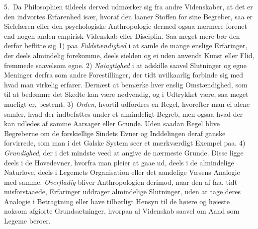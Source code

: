 \documentclass[12pt,a4paper]{article}
\newcommand{\opage}[1]{\marginnote{\footnotesize\textit{[#1]}}}
\begin{document}
5.~Da Philosophien tildeels derved udmærker sig fra andre Videnskaber, at det er
den indvortes Erfarenhed især, hvoraf den laaner Stoffen for sine Begreber, saa er
Sielelæren eller den psychologiske Anthropologie dermed ogsaa nærmere forenet end
nogen anden empirisk Videnskab eller Disciplin. Saa meget mere bør den derfor
beflitte sig 1) paa \emph{Fuldstændighed} i at samle de mange enslige Erfaringer,
der deels almindelig forekomme, deels sielden og ei uden anvendt Kunst eller
Flid, fremmede saavelsom egne. 2) \emph{Nøiagtighed} i at adskille saavel
Slutninger og egne Meninger derfra som andre Forestillinger, der tidt uvilkaarlig
forbinde sig med hvad man virkelig erfarer. Dernæst at bemærke hver enslig
Omstændighed, som til at bedømme det Skedte kan være nødvendig, og i Udtrykket
være, saa meget mueligt er, bestemt. 3) \emph{Orden}, hvortil udfordres
\opage{5} en Regel, hvorefter man ei alene samler, hvad der indbefattes under et
almindeligt Begreb, men ogsaa hvad der kan udledes af samme Aarsager eller
Grunde. Uden saadan Regel blive Begreberne om de forskiellige Sindets Evner og
Inddelingen deraf ganske forvirrede, som man i det Galske System seer et
mærkværdigt Exempel paa. 4) \emph{Grundighed}, der i det mindste veed at angive
de nærmeste Grunde. Disse ligge deels i de Hovedevner, hvorfra man pleier at gaae
ud, deels i de almindelige Naturlove, deels i Legemets Organisation eller det
aandelige Væsens Analogie med samme. \emph{Overfladig} bliver Anthropologien
derimod, naar den af faa, tidt misforstaaede, Erfaringer uddrager almindelige
Slutninger, uden at tage deres Analogie i Betragtning eller have tilbørligt
Hensyn til de høiere og høieste noksom afgiorte Grundsætninger, hvorpaa al
Videnskab saavel om Aand som Legeme beroer.
\end{document}
